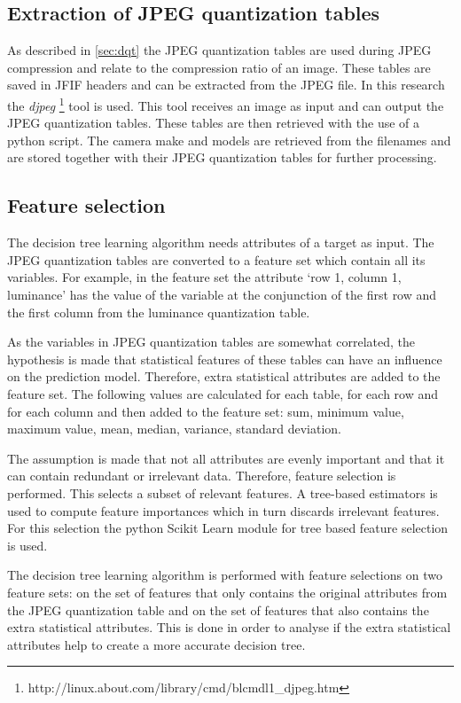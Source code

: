 \subsection{Extraction of JPEG quantization tables}
As described in \autoref{sec:dqt} the JPEG quantization tables are used during JPEG compression and relate to the compression ratio of an image. These tables are saved in JFIF headers and can be extracted from the JPEG file. In this research the \textit{djpeg} \footnote{http://linux.about.com/library/cmd/blcmdl1\_djpeg.htm} tool is used. This tool receives an image as input and can output the JPEG quantization tables. These tables are then retrieved with the use of a python script. The camera make and models are retrieved from the filenames and are stored together with their JPEG quantization tables for further processing.

\subsection{Feature selection}\label{sec:featselect}
The decision tree learning algorithm needs attributes of a target as input. The JPEG quantization tables are converted to a feature set which contain all its variables. For example, in the feature set the attribute `row 1, column 1, luminance' has the value of the variable at the conjunction of the first row and the first column from the luminance quantization table. 

As the variables in JPEG quantization tables are somewhat correlated, the hypothesis is made that statistical features of these tables can have an influence on the prediction model. Therefore, extra statistical attributes are added to the feature set. The following values are calculated for each table, for each row and for each column and then added to the feature set: sum, minimum value, maximum value, mean, median, variance, standard deviation.

The assumption is made that not all attributes are evenly important and that it can contain redundant or irrelevant data. Therefore, feature selection is performed. This selects a subset of relevant features. A tree-based estimators is used to compute feature importances which in turn discards irrelevant features. For this selection the python Scikit Learn \cite{scikit-learn} module for tree based feature selection is used.

The decision tree learning algorithm is performed with feature selections on two feature sets: on the set of features that only contains the original attributes from the JPEG quantization table and on the set of features that also contains the extra statistical attributes. This is done in order to analyse if the extra statistical attributes help to create a more accurate decision tree.

